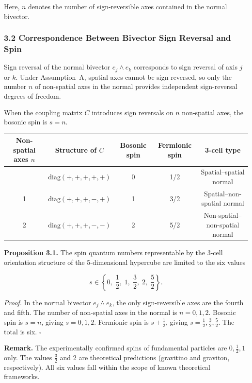 \documentclass[a4paper,11pt]{article}
\newcounter{none}
\begin{document}
Here, $n$ denotes the number of sign-reversible axes contained in the normal bivector.

\subsubsection*{3.2 Correspondence Between Bivector Sign Reversal and Spin}

Sign reversal of the normal bivector $e_j \wedge e_k$ corresponds to sign reversal of axis $j$ or $k$. Under Assumption~A, spatial axes cannot be sign-reversed, so only the number $n$ of non-spatial axes in the normal provides independent sign-reversal degrees of freedom.

When the coupling matrix $C$ introduces sign reversals on $n$ non-spatial axes, the bosonic spin is $s = n$.

{\def\LTcaptype{none}
\begin{longtable}[]{@{}ccccc@{}}
\toprule
Non-spatial axes $n$ & Structure of $C$ & Bosonic spin & Fermionic spin & 3-cell type \\
\midrule
\endhead
\bottomrule
\endlastfoot
0 & $\mathrm{diag}(+,+,+,+,+)$ & 0 & 1/2 & Spatial--spatial normal \\
1 & $\mathrm{diag}(+,+,+,-,+)$ & 1 & 3/2 & Spatial--non-spatial normal \\
2 & $\mathrm{diag}(+,+,+,-,-)$ & 2 & 5/2 & Non-spatial--non-spatial normal \\
\end{longtable}
}

\textbf{Proposition 3.1.} The spin quantum numbers representable by the 3-cell orientation structure of the 5-dimensional hypercube are limited to the six values

\[s \in \left\{ 0, \; \frac{1}{2}, \; 1, \; \frac{3}{2}, \; 2, \; \frac{5}{2} \right\}.\]

\emph{Proof.} In the normal bivector $e_j \wedge e_k$, the only sign-reversible axes are the fourth and fifth. The number of non-spatial axes in the normal is $n = 0, 1, 2$. Bosonic spin is $s = n$, giving $s = 0, 1, 2$. Fermionic spin is $s + \frac{1}{2}$, giving $s = \frac{1}{2}, \frac{3}{2}, \frac{5}{2}$. The total is six. $\square$

\textbf{Remark.} The experimentally confirmed spins of fundamental particles are $0, \frac{1}{2}, 1$ only. The values $\frac{3}{2}$ and $2$ are theoretical predictions (gravitino and graviton, respectively). All six values fall within the scope of known theoretical frameworks.
\end{document}
